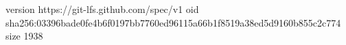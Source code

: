 version https://git-lfs.github.com/spec/v1
oid sha256:03396bade0fe4b6f0197bb7760ed96115a66b1f8519a38ed5d9160b855c2c774
size 1938
